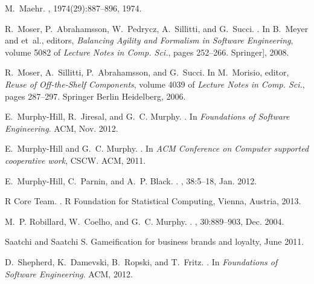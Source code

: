 \documentclass{sig-alternate}
\begin{document}
\begin{thebibliography}{10}
M.~Maehr.
, 1974(29):887--896, 1974.

R.~Moser, P.~Abrahamsson, W.~Pedrycz, A.~Sillitti, and G.~Succi.
.
\newblock In B.~Meyer and et~al., editors, {\em Balancing Agility and Formalism
  in Software Engineering}, volume 5082 of {\em Lecture Notes in Comp. Sci.},
  pages 252--266. Springer], 2008.

R.~Moser, A.~Sillitti, P.~Abrahamsson, and G.~Succi.
\newblock In M.~Morisio, editor, {\em Reuse of Off-the-Shelf Components},
  volume 4039 of {\em Lecture Notes in Comp. Sci.}, pages 287--297. Springer
  Berlin Heidelberg, 2006.

E.~Murphy-Hill, R.~Jiresal, and G.~C. Murphy.
.
\newblock In {\em Foundations of Software Engineering}. ACM, Nov. 2012.

E.~Murphy-Hill and G.~C. Murphy.
.
\newblock In {\em ACM Conference on Computer supported cooperative work}, CSCW.
  ACM, 2011.

E.~Murphy-Hill, C.~Parnin, and A.~P. Black.
.
, 38:5--18, Jan. 2012.

{R Core Team}.
.
\newblock R Foundation for Statistical Computing, Vienna, Austria, 2013.

M.~P. Robillard, W.~Coelho, and G.~C. Murphy.
.
, 30:889--903, Dec.
  2004.

{Saatchi and Saatchi S}.
\newblock Gameification for business brands and loyalty, June 2011.

D.~Shepherd, K.~Damevski, B.~Ropski, and T.~Fritz.
.
\newblock In {\em Foundations of Software Engineering}. ACM, 2012.


\end{thebibliography}
\end{document}

